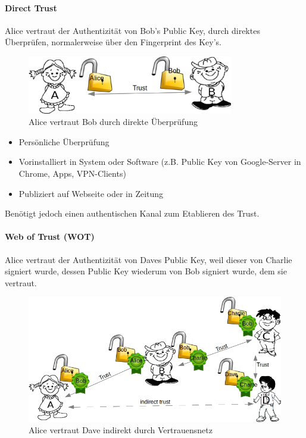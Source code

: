 \documentclass[10pt,a4paper]{article}
\begin{document}
\paragraph*{Direct Trust}
Alice vertraut der Authentizität von Bob's Public Key, durch direktes Überprüfen, normalerweise über den Fingerprint des Key's.
\begin{figure}[H]
    \begin{center}
    \includegraphics[width=9cm]{images/directtrust.png}
    \caption{Alice vertraut Bob durch direkte Überprüfung}
    \label{directtrust}
    \end{center}
\end{figure}
\begin{itemize}[noitemsep,topsep=0pt,leftmargin=*]
    \item Persönliche Überprüfung
    \item Vorinstalliert in System oder Software (z.B. Public Key von Google-Server in Chrome, Apps, VPN-Clients)
    \item Publiziert auf Webseite oder in Zeitung
\end{itemize}
Benötigt jedoch einen authentischen Kanal zum Etablieren des Trust.

\paragraph*{Web of Trust (WOT)}
Alice vertraut der Authentizität von Daves Public Key, weil dieser von Charlie signiert wurde, dessen Public Key wiederum von Bob signiert wurde, dem sie vertraut.
\begin{figure}[H]
    \begin{center}
    \includegraphics[width=12cm]{images/wot.png}
    \caption{Alice vertraut Dave indirekt durch Vertrauensnetz}
    \label{wot}
    \end{center}
\end{figure}
\end{document}
